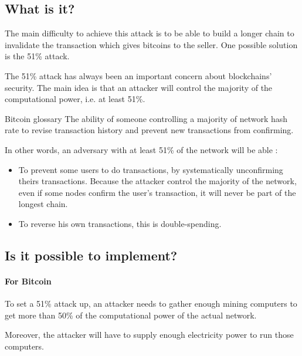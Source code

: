   \subsection{What is it?}

The main difficulty to achieve this attack is to be able to build a longer chain to invalidate the transaction which gives bitcoins to the seller. One possible solution is the 51\% attack.

The 51\% attack has always been an important concern about blockchains' security. The main idea is that an attacker will control the majority of the computational power, i.e. at least 51\%.

\clearpage

\begin{pquotation}{Bitcoin glossary \cite{51Percent_definition}}
The ability of someone controlling a majority of network hash rate to revise transaction history and prevent new transactions from confirming.
\end{pquotation}

In other words, an adversary with at least 51\% of the network will be able :

\begin{itemize}
  \item To prevent some users to do transactions, by systematically unconfirming theirs transactions. Because the attacker control the majority of the network, even if some nodes confirm the user's transaction, it will never be part of the longest chain.
  \item To reverse his own transactions, this is double-spending.
\end{itemize}

  \subsection{Is it possible to implement?}

    \paragraph{For Bitcoin}

To set a 51\% attack up, an attacker needs to gather enough mining computers to get more than 50\% of the computational power of the actual network.

Moreover, the attacker will have to supply enough electricity power to run those computers. \newline


